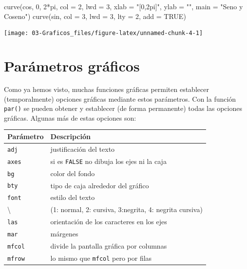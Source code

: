 \documentclass[
]{book}
\newenvironment{Shaded}{\begin{snugshade}}{\end{snugshade}}
\newcommand{\AttributeTok}[1]{\textcolor[rgb]{0.77,0.63,0.00}{#1}}
\newcommand{\ConstantTok}[1]{\textcolor[rgb]{0.00,0.00,0.00}{#1}}
\newcommand{\DecValTok}[1]{\textcolor[rgb]{0.00,0.00,0.81}{#1}}
\newcommand{\FunctionTok}[1]{\textcolor[rgb]{0.00,0.00,0.00}{#1}}
\newcommand{\NormalTok}[1]{#1}
\newcommand{\SpecialCharTok}[1]{\textcolor[rgb]{0.00,0.00,0.00}{#1}}
\newcommand{\StringTok}[1]{\textcolor[rgb]{0.31,0.60,0.02}{#1}}
\theoremstyle{break}
\theoremstyle{nonumberplain}
\begin{document}
\begin{Shaded}
\begin{Highlighting}[]
\FunctionTok{curve}\NormalTok{(cos, }\DecValTok{0}\NormalTok{, }\DecValTok{2}\SpecialCharTok{*}\NormalTok{pi, }\AttributeTok{col =} \DecValTok{2}\NormalTok{, }\AttributeTok{lwd =} \DecValTok{3}\NormalTok{, }
      \AttributeTok{xlab =} \StringTok{"[0,2pi]"}\NormalTok{, }\AttributeTok{ylab =} \StringTok{""}\NormalTok{, }\AttributeTok{main =} \StringTok{"Seno y Coseno"}\NormalTok{)}
\FunctionTok{curve}\NormalTok{(sin, }\AttributeTok{col =} \DecValTok{3}\NormalTok{, }\AttributeTok{lwd =} \DecValTok{3}\NormalTok{, }\AttributeTok{lty =} \DecValTok{2}\NormalTok{, }\AttributeTok{add =} \ConstantTok{TRUE}\NormalTok{)}
\end{Highlighting}
\end{Shaded}

\begin{center}\texttt{[image: 03-Graficos\_files/figure-latex/unnamed-chunk-4-1]} \end{center}

\hypertarget{paruxe1metros-gruxe1ficos}{%
\section{Parámetros gráficos}\label{paruxe1metros-gruxe1ficos}}

Como ya hemos visto, muchas funciones gráficas permiten establecer (temporalmente)
opciones gráficas mediante estos parámetros.
Con la función \texttt{par()} se pueden obtener y establecer (de forma permanente) todas las opciones gráficas.
Algunas más de estas opciones son:

\begin{longtable}[]{@{}ll@{}}
\toprule
Parámetro & Descripción \\
\midrule
\endhead
\texttt{adj} & justificación del texto \\
\texttt{axes} & si es \texttt{FALSE} no dibuja los ejes ni la caja \\
\texttt{bg} & color del fondo \\
\texttt{bty} & tipo de caja alrededor del gráfico \\
\texttt{font} & estilo del texto \\
\textbackslash{} & (1: normal, 2: cursiva, 3:negrita, 4: negrita cursiva) \\
\texttt{las} & orientación de los caracteres en los ejes \\
\texttt{mar} & márgenes \\
\texttt{mfcol} & divide la pantalla gráfica por columnas \\
\texttt{mfrow} & lo mismo que \texttt{mfcol} pero por filas \\
\bottomrule
\end{longtable}
\end{document}
